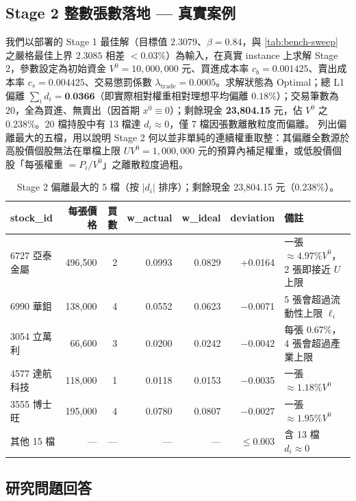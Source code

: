 \documentclass[11pt,a4paper]{article}
\begin{document}
\subsection{Stage 2 整數張數落地 — 真實案例}

我們以部署的 Stage 1 最佳解（目標值 $2.3079$、$\beta = 0.84$，與 \cref{tab:bench-sweep} 之嚴格最佳上界 $2.3085$ 相差 $<0.03\%$）為輸入，在真實 instance 上求解 Stage 2，參數設定為初始資金 $V^0 = 10{,}000{,}000$ 元、買進成本率 $c_b = 0.001425$、賣出成本率 $c_s = 0.004425$、交易懲罰係數 $\lambda_{\text{trade}} = 0.0005$。求解狀態為 Optimal；總 L1 偏離 $\sum_i d_i = \textbf{0.0366}$（即實際相對權重相對理想平均偏離 $0.18\%$）；交易筆數為 $20$，全為買進、無賣出（因首期 $x^0 \equiv 0$）；剩餘現金 \textbf{23{,}804.15} 元，佔 $V^0$ 之 $0.238\%$。20 檔持股中有 13 檔達 $d_i \approx 0$，僅 7 檔因張數離散粒度而偏離。 列出偏離最大的五檔，用以說明 Stage 2 何以並非單純的連續權重取整：其偏離全數源於高股價個股無法在單檔上限 $U V^0 = 1{,}000{,}000$ 元的預算內補足權重，或低股價個股「每張權重 $= P_i / V^0$」之離散粒度過粗。

\begin{table}[!hbt]
\centering
\small
\begin{tabular}{l r r r r r p{4.5cm}}
\toprule
stock\_id & 每張價格 & 買數 & w\_actual & w\_ideal & deviation & 備註 \\
\midrule
6727 亞泰金屬 & 496{,}500 & 2 & 0.0993 & 0.0829 & +0.0164 & 一張 $\approx 4.97\% V^0$，2 張即接近 $U$ 上限 \\
6990 華鉬     & 138{,}000 & 4 & 0.0552 & 0.0623 & $-$0.0071 & 5 張會超過流動性上限 $\ell_i$ \\
3054 立萬利   &  66{,}600 & 3 & 0.0200 & 0.0242 & $-$0.0042 & 每張 0.67\%，4 張會超過產業上限 \\
4577 達航科技 & 118{,}000 & 1 & 0.0118 & 0.0153 & $-$0.0035 & 一張 $\approx 1.18\% V^0$ \\
3555 博士旺   & 195{,}000 & 4 & 0.0780 & 0.0807 & $-$0.0027 & 一張 $\approx 1.95\% V^0$ \\
其他 15 檔    & — & — & — & — & $\leq 0.003$ & 含 13 檔 $d_i \approx 0$ \\
\bottomrule
\end{tabular}
\caption{Stage 2 偏離最大的 5 檔（按 $|d_i|$ 排序）；剩餘現金 23{,}804.15 元（0.238\%）。}
\label{tab:order-sheet}
\end{table}

\subsection{研究問題回答}
\end{document}
